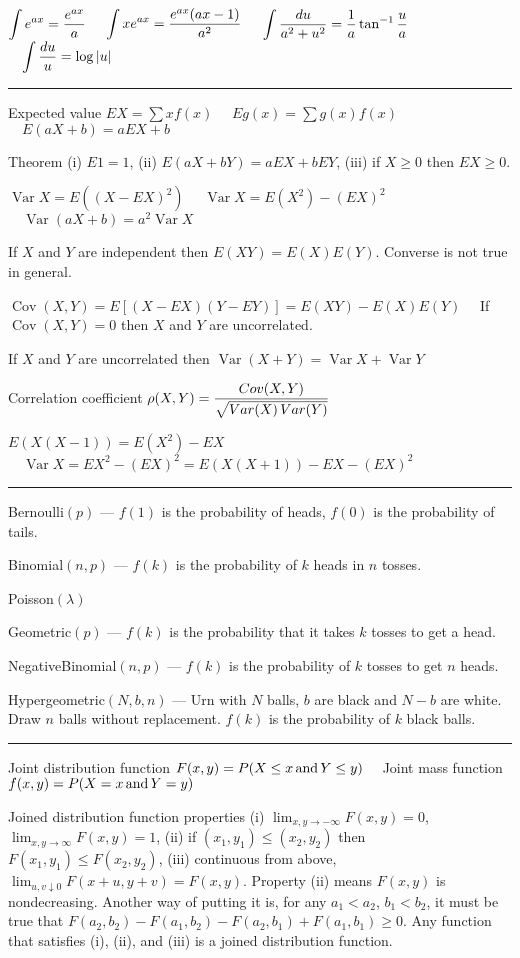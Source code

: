 \documentclass[10pt]{article}
\begin{document}
\begin{plain}
\smallskip
$\displaystyle \int e^{ax}={e^{ax}\over a}$
$\quad\displaystyle \int xe^{ax}={e^{ax}(ax-1)\over a^2}$
$\quad\displaystyle \int{du\over a^2+u^2}
={1\over a}\tan^{-1}{u\over a}$
$\quad\displaystyle\int {du\over u}=\log|u|$

\smallskip
\hrule

\smallskip
Expected value $EX=\sum xf(x)$
$\quad Eg(x)=\sum g(x)f(x)$
$\quad E(aX+b)=aEX+b$

\smallskip
Theorem (i) $E1=1$, (ii) $E(aX+bY)=aEX+bEY$,
(iii) if $X\ge0$ then $EX\ge0$.

\smallskip
$\mathop{Var}X=E((X-EX)^2)$
$\quad\mathop{Var}X=E(X^2)-(EX)^2$
$\quad\mathop{Var}(aX+b)=a^2\mathop{Var}X$

\smallskip
If $X$ and $Y$ are independent then $E(XY)=E(X)E(Y)$.
Converse is not true in general.

\smallskip
$\mathop{Cov}(X,Y)=E[(X-EX)(Y-EY)]=E(XY)-E(X)E(Y)\quad$
If $\mathop{Cov}(X,Y)=0$ then $X$ and $Y$ are uncorrelated.

\smallskip
If $X$ and $Y$ are uncorrelated then
$\mathop{Var}(X+Y)=\mathop{Var}X+\mathop{Var}Y$

\smallskip
Correlation coefficient
$\displaystyle \rho(X,Y)={\mathop{Cov}(X,Y)
\over\sqrt{\mathop{Var}(X)\mathop{Var}(Y)}}$

\smallskip
$E(X(X-1))=E(X^2)-EX$
$\quad\mathop{Var}X=EX^2-(EX)^2=E(X(X+1))-EX-(EX)^2$

\smallskip
\hrule

\smallskip
Bernoulli$(p)$ ---
$f(1)$ is the probability of heads, $f(0)$ is the probability
of tails.

Binomial$(n,p)$ ---
$f(k)$ is the probability of $k$ heads in $n$ tosses.

Poisson$(\lambda)$

Geometric$(p)$ ---
$f(k)$ is the probability that it takes $k$ tosses to get a head.

NegativeBinomial$(n,p)$ ---
$f(k)$ is the probability of $k$ tosses to get $n$ heads.

Hypergeometric$(N,b,n)$ ---
Urn with $N$ balls, $b$ are black and $N-b$ are white.
Draw $n$ balls without replacement.
$f(k)$ is the probability of $k$ black balls.

\smallskip
\hrule

\smallskip
Joint distribution function
$F(x,y)=P(X\le x\,\hbox{and}\,Y\le y)\quad$
Joint mass function
$f(x,y)=P(X=x\,\hbox{and}\,Y=y)$

\smallskip
Joined distribution function properties
(i) $\lim_{x,y\to-\infty}F(x,y)=0$,
$\lim_{x,y\to\infty}F(x,y)=1$,
(ii) if $(x_1,y_1)\le(x_2,y_2)$ then $F(x_1,y_1)\le F(x_2,y_2)$,
(iii) continuous from above,
$\lim_{u,v\downarrow0}F(x+u,y+v)=F(x,y)$.
Property (ii) means $F(x,y)$ is nondecreasing.
Another way of putting it is, for any $a_1<a_2$, $b_1<b_2$,
it must be true that
$F(a_2,b_2)-F(a_1,b_2)-F(a_2,b_1)+F(a_1,b_1)\ge0$.
Any function that satisfies (i), (ii), and (iii) is a joined
distribution function.


\end{plain}
\end{document}
